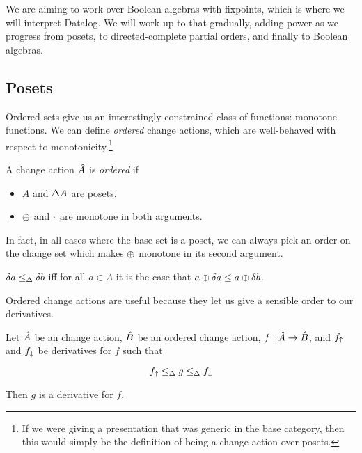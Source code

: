 We are aiming to work over Boolean algebras with fixpoints, which is where we
will interpret Datalog. We will work up to that gradually, adding power as we
progress from posets, to directed-complete partial orders, and
finally to Boolean algebras.

\subsection{Posets}

Ordered sets give us an interestingly constrained class of functions: monotone
functions. We can define \emph{ordered} change actions, which are well-behaved
with respect to monotonicity.\footnote{If we were giving a presentation that was
generic in the base category, then this would simply be the definition of being
a change action over posets.}

\begin{defn}
  A change action $\hat{A}$ is \emph{ordered} if
  \begin{itemize}
    \item $A$ and $\Delta A$ are posets.
    \item $\oplus$ and $\cdot$ are monotone in both arguments.
  \end{itemize}
\end{defn}

In fact, in all cases where the base set is a poset, we can always pick an order on the change
set which makes $\oplus$ monotone in its second argument.

\begin{defn}
  $\delta a \leq_\Delta \delta b$ iff for all $a \in A$ it is the case that $a \oplus \delta a \leq a \oplus \delta b$.
\end{defn}

Ordered change actions are useful because they let us give a sensible order
to our derivatives.

\begin{thm}
  \label{thm:sandwich}
  Let $\hat{A}$ be an change action, $\hat{B}$ be an ordered change action,
  $f: \hat{A} \rightarrow \hat{B}$, and $f_\uparrow$ and $f_\downarrow$ be
  derivatives for $f$ such that

  \begin{displaymath}
    f_\uparrow \leq_\Delta g \leq_\Delta f_\downarrow
  \end{displaymath}

  Then $g$ is a derivative for $f$.
\end{thm}

